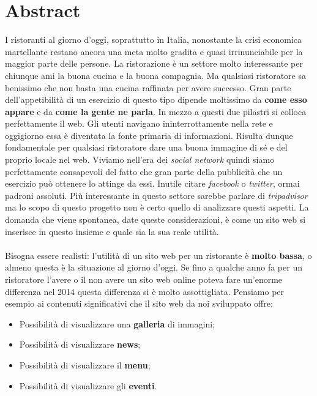 \section{Abstract}

I ristoranti al giorno d'oggi, soprattutto in Italia, nonostante la crisi economica martellante restano ancora una meta molto gradita e quasi irrinunciabile per la maggior parte delle persone. La ristorazione è un settore molto interessante per chiunque ami la buona cucina e la buona compagnia. Ma qualsiasi ristoratore sa benissimo che non basta una cucina raffinata per avere successo. Gran parte dell'appetibilità di un esercizio di questo tipo dipende moltissimo da \textbf{come esso appare} e da \textbf{come la gente ne parla}. In mezzo a questi due pilastri si colloca perfettamente il web. Gli utenti navigano ininterrottamente nella rete e oggigiorno essa è diventata la fonte primaria di informazioni. Risulta dunque fondamentale per qualsiasi ristoratore dare una buona immagine di sé e del proprio locale nel web. Viviamo nell'era dei \textit{social network} quindi siamo perfettamente consapevoli del fatto che gran parte della pubblicità che un esercizio può ottenere lo attinge da essi. Inutile citare \textit{facebook} o \textit{twitter}, ormai padroni assoluti. Più interessante in questo settore sarebbe parlare di \textit{tripadvisor} ma lo scopo di questo progetto non è certo quello di analizzare questi aspetti. La domanda che viene spontanea, date queste considerazioni, è come un sito web si inserisce in questo insieme e quale sia la sua reale utilità. \\ \\
Bisogna essere realisti: l'utilità di un sito web per un ristorante è \textbf{molto bassa}, o almeno questa è la situazione al giorno d'oggi. Se fino a qualche anno fa per un ristoratore l'avere o il non avere un sito web online poteva fare un'enorme differenza nel 2014 questa differenza si è molto assottigliata. Pensiamo per esempio ai contenuti significativi che il sito web da noi sviluppato offre:

\begin{itemize}

	\item Possibilità di visualizzare una \textbf{galleria} di immagini;
	\item Possibilità di visualizzare \textbf{news};
	\item Possibilità di visualizzare il \textbf{menu};
	\item Possibilità di visualizzare gli \textbf{eventi}.

\end{itemize}

